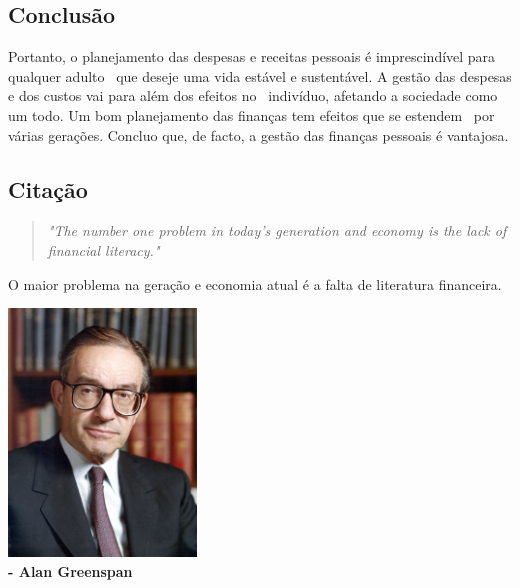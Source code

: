 \documentclass[a4paper,11pt]{report}
\begin{document}
\begin{multicols}{2}
			\section{Conclusão}
				\hspace{1cm} Portanto, o planejamento das despesas e receitas pessoais é imprescindível para qualquer adulto \
				que deseje uma vida estável e sustentável. A gestão das despesas e dos custos vai para além dos efeitos no \
				indivíduo, afetando a sociedade como um todo. Um bom planejamento das finanças tem efeitos que se estendem \
				por várias gerações. Concluo que, de facto, a gestão das finanças pessoais é vantajosa.
		\end{multicols}
	
		\vskip 0.5cm

		\begin{multicols}{2}
			\section{Citação \cite{intro:citacao}} %
			\vskip -1cm
			\begin{center}
				\begin{quote}
					\LARGE
					\emph{"The number one problem in today’s generation and economy is the lack of financial literacy."}
				\end{quote}
				\normalsize{O maior problema na geração e economia atual é a falta de literatura financeira.} \\
			\end{center}
			\vskip -1cm
			\begin{center}
				\includegraphics[width=5cm]{./alan_greenspan.jpg} \\
				\Large \textbf{- Alan Greenspan \cite{intro:bibliografia}}
			\end{center}
		\end{multicols}
		
\end{document}
